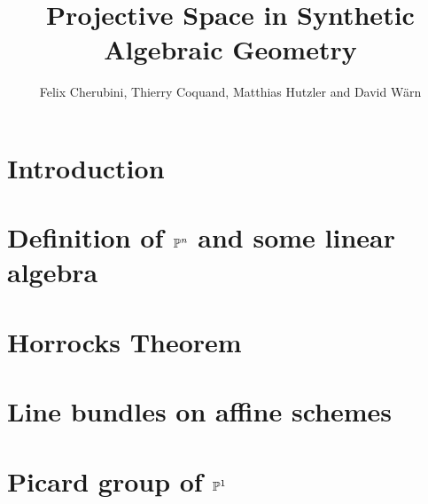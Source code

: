 \documentclass{../util/zariski-small}
\title{Projective Space in Synthetic Algebraic Geometry}
\begin{document}
\author{Felix Cherubini, Thierry Coquand, Matthias Hutzler and David Wärn}

\maketitle

\section*{Introduction}


\section[Definition of projective space and some linear algebra]{Definition of $\mathbb{P}^n$ and some linear algebra}


\section{Horrocks Theorem}


\section{Line bundles on affine schemes}


\section[Picard group of projective space]{Picard group of $\mathbb{P}^1$}


\newpage



\printindex

\printbibliography
\end{document}
